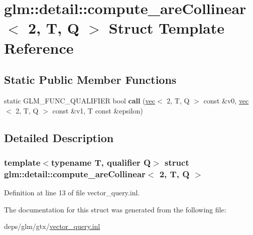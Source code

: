 \hypertarget{structglm_1_1detail_1_1compute__areCollinear_3_012_00_01T_00_01Q_01_4}{}\section{glm\+:\+:detail\+:\+:compute\+\_\+are\+Collinear$<$ 2, T, Q $>$ Struct Template Reference}
\label{structglm_1_1detail_1_1compute__areCollinear_3_012_00_01T_00_01Q_01_4}
\subsection*{Static Public Member Functions}
\begin{DoxyCompactItemize}
\item 
\mbox{\label{structglm_1_1detail_1_1compute__areCollinear_3_012_00_01T_00_01Q_01_4_a4a32a093975dd49210dafdcb0be3b108}} 
static G\+L\+M\+\_\+\+F\+U\+N\+C\+\_\+\+Q\+U\+A\+L\+I\+F\+I\+ER bool {\bfseries call} (\hyperlink{structglm_1_1vec}{vec}$<$ 2, T, Q $>$ const \&v0, \hyperlink{structglm_1_1vec}{vec}$<$ 2, T, Q $>$ const \&v1, T const \&epsilon)
\end{DoxyCompactItemize}


\subsection{Detailed Description}
\subsubsection*{template$<$typename T, qualifier Q$>$\newline
struct glm\+::detail\+::compute\+\_\+are\+Collinear$<$ 2, T, Q $>$}



Definition at line 13 of file vector\+\_\+query.\+inl.



The documentation for this struct was generated from the following file\+:\begin{DoxyCompactItemize}
\item 
deps/glm/gtx/\hyperlink{vector__query_8inl}{vector\+\_\+query.\+inl}\end{DoxyCompactItemize}
